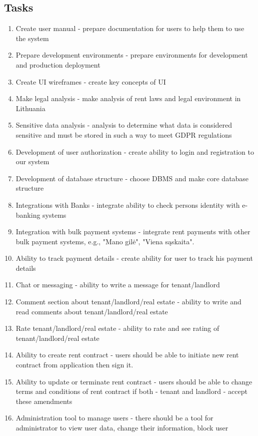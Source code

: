 \documentclass{VUMIFPSkursinis}
\begin{document}
	\subsection{Tasks}
	\begin{enumerate}
		\item{Create user manual} - prepare documentation for users to help them to use the system
		\item{Prepare development environments} - prepare environments for development and production deployment
		\item{Create UI wireframes} - create key concepts of UI
		\item{Make legal analysis} - make analysis of rent laws and legal environment in Lithuania
		\item {Sensitive data analysis} - analysis to determine what data is considered sensitive and must be stored in such a way to meet GDPR regulations
		\item{Development of user authorization} - create ability to login and registration to our system
		\item{Development of database structure} - choose DBMS and make core database structure
		\item{Integrations with Banks} - integrate ability to check persons identity with e-banking systems
		\item{Integration with bulk payment systems} - integrate rent payments with other bulk payment systems, e.g., "Mano gilė", "Viena sąskaita".
		\item{Ability to track payment details} - create ability for user to track his payment details
		\item{Chat or messaging} - ability to write a message for tenant/landlord
		\item{Comment section about tenant/landlord/real estate} - ability to write and read comments about tenant/landlord/real estate
		\item{Rate tenant/landlord/real estate} - ability to rate and see rating of tenant/landlord/real estate
		\item{Ability to create rent contract} - users should be able to initiate new rent contract from application then sign it.
		\item{Ability to update or terminate rent contract} - users should be able to change terms and conditions of rent contract if both - tenant and landlord - accept these amendments
		\item{Administration tool to manage users} - there should be a tool for administrator to view user data, change their information, block user

\end{enumerate}
\end{document}
